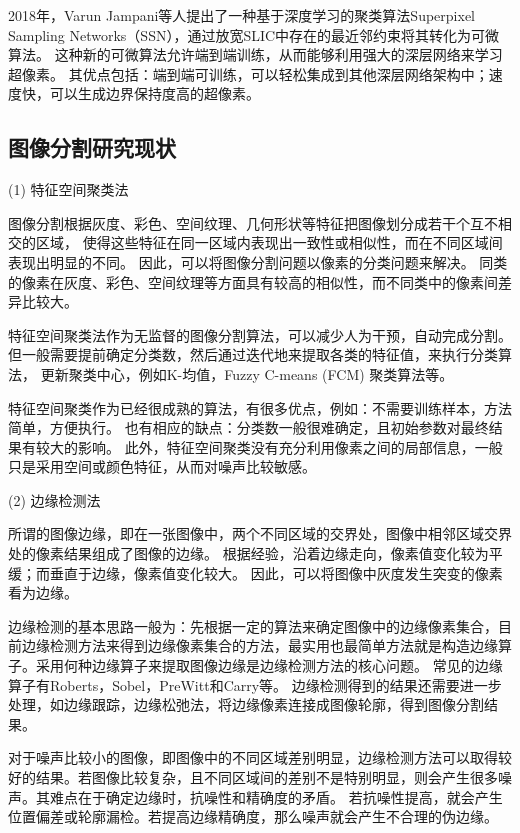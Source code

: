 2018年，Varun Jampani等人提出了一种基于深度学习的聚类算法Superpixel Sampling Networks（SSN）\citep{jampani2018superpixel}，通过放宽SLIC中存在的最近邻约束将其转化为可微算法。
这种新的可微算法允许端到端训练，从而能够利用强大的深层网络来学习超像素。
其优点包括：端到端可训练，可以轻松集成到其他深层网络架构中；速度快，可以生成边界保持度高的超像素。


\subsection{图像分割研究现状}

(1) 特征空间聚类法

图像分割根据灰度、彩色、空间纹理、几何形状等特征把图像划分成若干个互不相交的区域，
使得这些特征在同一区域内表现出一致性或相似性，而在不同区域间表现出明显的不同。
因此，可以将图像分割问题以像素的分类问题来解决。
同类的像素在灰度、彩色、空间纹理等方面具有较高的相似性，而不同类中的像素间差异比较大。

特征空间聚类法作为无监督的图像分割算法，可以减少人为干预，自动完成分割。
但一般需要提前确定分类数，然后通过迭代地来提取各类的特征值，来执行分类算法，
更新聚类中心，例如K-均值\cite{comaniciu2002mean}，Fuzzy C-means (FCM)\cite{zaixin2013neighbourhood,gong2012fuzzy,zhang2017novel} 聚类算法等。

特征空间聚类作为已经很成熟的算法，有很多优点，例如：不需要训练样本，方法简单，方便执行。
也有相应的缺点：分类数一般很难确定，且初始参数对最终结果有较大的影响。
此外，特征空间聚类没有充分利用像素之间的局部信息，一般只是采用空间或颜色特征，从而对噪声比较敏感。

(2) 边缘检测法

所谓的图像边缘，即在一张图像中，两个不同区域的交界处，图像中相邻区域交界处的像素结果组成了图像的边缘。
根据经验，沿着边缘走向，像素值变化较为平缓；而垂直于边缘，像素值变化较大。
因此，可以将图像中灰度发生突变的像素看为边缘。

边缘检测的基本思路一般为：先根据一定的算法来确定图像中的边缘像素集合，目前边缘检测方法来得到边缘像素集合的方法，最实用也最简单方法就是构造边缘算子。采用何种边缘算子来提取图像边缘是边缘检测方法的核心问题。
常见的边缘算子有Roberts，Sobel，PreWitt和Carry等。
边缘检测得到的结果还需要进一步处理，如边缘跟踪，边缘松弛法，将边缘像素连接成图像轮廓，得到图像分割结果。


对于噪声比较小的图像，即图像中的不同区域差别明显，边缘检测方法可以取得较好的结果。若图像比较复杂，且不同区域间的差别不是特别明显，则会产生很多噪声。其难点在于确定边缘时，抗噪性和精确度的矛盾。
若抗噪性提高，就会产生位置偏差或轮廓漏检。若提高边缘精确度，那么噪声就会产生不合理的伪边缘。

